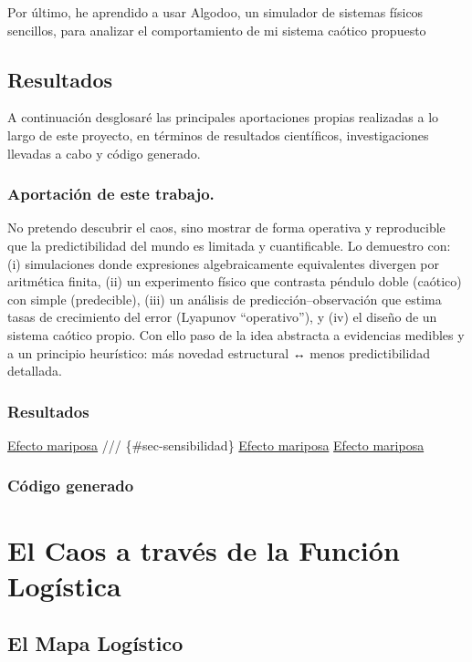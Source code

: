 \documentclass[
  11pt,
  a4paper,
  DIV=11,
  numbers=noendperiod]{scrreprt}
\begin{document}
Por último, he aprendido a usar Algodoo, un simulador de sistemas
físicos sencillos, para analizar el comportamiento de mi sistema caótico
propuesto

\chapter{Resultados}\label{resultados}

A continuación desglosaré las principales aportaciones propias
realizadas a lo largo de este proyecto, en términos de resultados
científicos, investigaciones llevadas a cabo y código generado.

\section{Aportación de este
trabajo.}\label{aportaciuxf3n-de-este-trabajo.}

No pretendo descubrir el caos, sino mostrar de forma operativa y
reproducible que la predictibilidad del mundo es limitada y
cuantificable. Lo demuestro con: (i) simulaciones donde expresiones
algebraicamente equivalentes divergen por aritmética finita, (ii) un
experimento físico que contrasta péndulo doble (caótico) con simple
(predecible), (iii) un análisis de predicción--observación que estima
tasas de crecimiento del error (Lyapunov ``operativo''), y (iv) el
diseño de un sistema caótico propio. Con ello paso de la idea abstracta
a evidencias medibles y a un principio heurístico: más novedad
estructural ↔ menos predictibilidad detallada.

\section{Resultados}\label{resultados-1}

\hyperref[sec-sensibilidad]{Efecto mariposa} /// \{\#sec-sensibilidad\}
\hyperref[sec-inestabilidad]{Efecto mariposa}
\hyperref[sec-exponente]{Efecto mariposa}

\section{Código generado}\label{cuxf3digo-generado}

\part{El Caos a través de la Función Logística}

\chapter{El Mapa Logístico}\label{el-mapa-loguxedstico}
\end{document}
